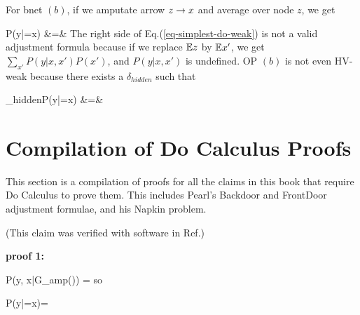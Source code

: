 For bnet $(b)$,
if we amputate arrow
$z\rightarrow x$
and average over node $z$,
we get

\beqa
P(y|\cald \rvx =x)
&=&
\bcen
{}\ecen
\label{eq-simplest-do-weak}
\eeqa
The right
side of Eq.(\ref{eq-simplest-do-weak})
is not a valid
adjustment formula
because
if we replace ${ \mathbb{E}} z$ by ${ \mathbb{E}} x' $, we get 
$\sum_{x'}P(y|x, x')P(x')$,
and $P(y|x, x')$ is undefined.
OP $(b)$ is not even 
HV-weak
because
there exists a
 $\delta_{hidden}$
such that

\beqa
\delta_{hidden}P(y|\cald \rvx =x)
&=&
\bcen
{}\ecen
{}
\eeqa





\section{Compilation of Do Calculus Proofs}
This section
is a compilation 
of proofs for
all the claims
in this book
that require Do Calculus to prove them. This includes
Pearl's Backdoor
and FrontDoor adjustment formulae,
and his Napkin problem.



\begin{claim}
\label{cl-decBackDoor}
\decBackDoor
\end{claim}

\proof
(This claim was verified with software in 
Ref.\cite{dag-iden-detector})

{\bf * proof 1:}

\beq
P(y, x|G_{amp(\rvx)})
=
\bcen
{}\ecen
\eeq
so

\beq
P(y|\cald \rvx =x)=
\bcen
{}\ecen
\eeq


